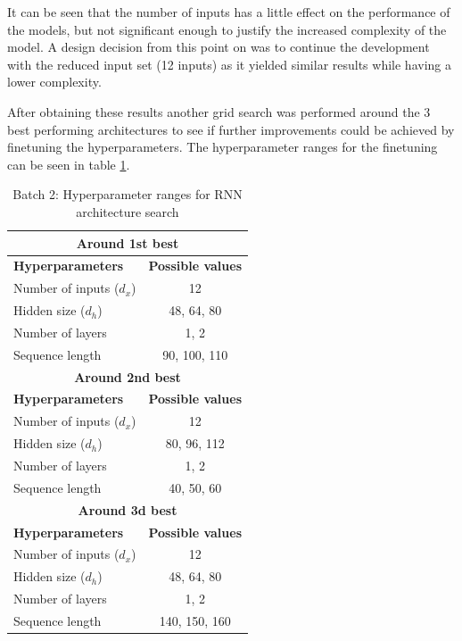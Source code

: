 \FloatBarrier
It can be seen that the number of inputs has a little effect on the performance of the models, but not significant enough to justify the increased complexity of the model. A design decision from this point on was to continue the development with the reduced input set (12 inputs) as it yielded similar results while having a lower complexity.

After obtaining these results another grid search was performed around the 3 best performing architectures to see if further improvements could be achieved by finetuning the hyperparameters. The hyperparameter ranges for the finetuning can be seen in table \ref{tab:rnn_hyperparams_2}. 

\FloatBarrier
\begin{table}[h]
    \centering
    \begin{tabular}{|l|c|}
        \hline
        \multicolumn{2}{|c|}{\textbf{Around 1st best}} \\
        \hline
        \textbf{Hyperparameters} & \textbf{Possible values} \\
        \hline
        Number of inputs ($d_x$) & 12 \\
        \hline
        Hidden size ($d_h$) & 48, 64, 80 \\
        \hline
        Number of layers & 1, 2 \\
        \hline
        Sequence length & 90, 100, 110 \\
        \hline \hline
        \multicolumn{2}{|c|}{\textbf{Around 2nd best}} \\
        \hline
        \textbf{Hyperparameters} & \textbf{Possible values} \\
        \hline
        Number of inputs ($d_x$) & 12 \\
        \hline
        Hidden size ($d_h$) & 80, 96, 112 \\
        \hline
        Number of layers & 1, 2 \\
        \hline
        Sequence length & 40, 50, 60 \\
        \hline \hline
        \multicolumn{2}{|c|}{\textbf{Around 3d best}} \\
        \hline
        \textbf{Hyperparameters} & \textbf{Possible values} \\
        \hline
        Number of inputs ($d_x$) & 12 \\
        \hline
        Hidden size ($d_h$) & 48, 64, 80 \\
        \hline
        Number of layers & 1, 2 \\
        \hline
        Sequence length & 140, 150, 160 \\
        \hline
    \end{tabular}
    \caption{Batch 2: Hyperparameter ranges for RNN architecture search}
    \label{tab:rnn_hyperparams_2}
\end{table}
\FloatBarrier

